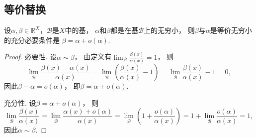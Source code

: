 \subsection{等价替换}
\begin{theorem}\label{theorem:极限.无穷小的比较1}
设\(\alpha,\beta\in\mathbb{R}^X\)，\(\mathcal{B}\)是\(X\)中的基，
\(\alpha\)和\(\beta\)都是在基\(\mathcal{B}\)上的无穷小，
则\(\beta\)与\(\alpha\)是等价无穷小的充分必要条件是
\(\beta = \alpha + o(\alpha)\).
\begin{proof}
必要性.
设\(\alpha\sim\beta\)，
由定义有\(\lim_\mathcal{B} \frac{\beta(x)}{\alpha(x)} = 1\)，
则\[
	\lim_\mathcal{B} \frac{\beta(x)-\alpha(x)}{\alpha(x)}
	= \lim_\mathcal{B} \left(\frac{\beta(x)}{\alpha(x)}-1\right)
	= \lim_\mathcal{B} \frac{\beta(x)}{\alpha(x)}-1 = 0,
\]
因此\(\beta-\alpha=o(\alpha)\)，
即\(\beta=\alpha+o(\alpha)\).

充分性.
设\(\beta=\alpha+o(\alpha)\)，
则\[
	\lim_\mathcal{B} \frac{\beta(x)}{\alpha(x)}
	= \lim_\mathcal{B} \frac{\alpha(x)+o(\alpha)}{\alpha(x)}
	= \lim_\mathcal{B} \left(1+\frac{o(\alpha)}{\alpha(x)}\right)
	= 1 + \lim_\mathcal{B} \frac{o(\alpha)}{\alpha(x)}
	= 1,
\]
因此\(\alpha\sim\beta\).
\end{proof}
\end{theorem}
